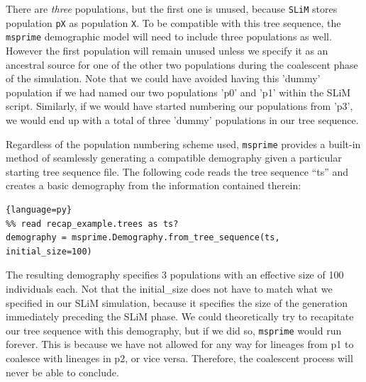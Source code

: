 \documentclass[12pt]{article}
\newcommand{\msprime}[0]{\texttt{msprime}\xspace}
\newcommand{\slim}[0]{\texttt{SLiM}\xspace}
\begin{document}
There are \emph{three} populations, but the first one is unused, because \slim stores population \texttt{pX} as population \texttt{X}.
To be compatible with this tree sequence, the \msprime demographic model will need to include three populations as well.
However the first population will remain unused unless we specify it as an ancestral source for
one of the other two populations during the coalescent phase of the simulation. Note that we could have avoided having this
'dummy' population if we had named our two populations 'p0' and 'p1' within the SLiM script. Similarly, if we would have started
numbering our populations from 'p3', we would end up with a total of three 'dummy' populations in our tree sequence.

Regardless of the population numbering scheme used, \msprime provides a built-in method of seamlessly generating a
compatible demography given a particular starting tree sequence file. The following code reads the tree sequence ``ts''
and creates a basic demography from the information contained therein: 
\begin{lstlisting}{language=py}
%% read recap_example.trees as ts?
demography = msprime.Demography.from_tree_sequence(ts, initial_size=100)
\end{lstlisting}

The resulting demography specifies 3 populations with an effective size of 100 individuals each. Not that the initial_size
does not have to match what we specified in our SLiM simulation, because it specifies the size of the generation
immediately preceding the SLiM phase. We could theoretically try to recapitate our tree sequence with this
demography, but if we did so, \msprime would run forever. This is because we have not allowed for any way for
lineages from p1 to coalesce with lineages in p2, or vice versa. Therefore, the coalescent process will never be able to conclude.
\end{document}
